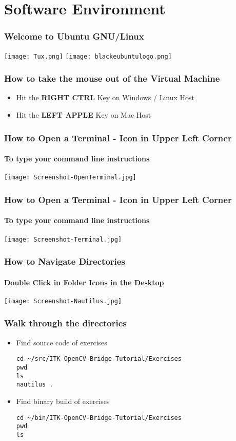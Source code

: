 \section{Software Environment}


\begin{frame}
\frametitle{Welcome to Ubuntu GNU/Linux}
\begin{center}
\texttt{[image: Tux.png]}
\texttt{[image: blackeubuntulogo.png]}
\end{center}
\end{frame}

\begin{frame}
\frametitle{How to take the mouse out of the Virtual Machine}
\begin{itemize}
\item Hit the \textbf{RIGHT CTRL} Key on Windows / Linux Host
\item Hit the \textbf{LEFT APPLE} Key on Mac Host
\end{itemize}
\end{frame}

\begin{frame}
\frametitle{How to Open a Terminal - Icon in Upper Left Corner}
\framesubtitle{To type your command line instructions}
\begin{center}
\texttt{[image: Screenshot-OpenTerminal.jpg]}
\end{center}
\end{frame}

\begin{frame}
\frametitle{How to Open a Terminal - Icon in Upper Left Corner}
\framesubtitle{To type your command line instructions}
\begin{center}
\texttt{[image: Screenshot-Terminal.jpg]}
\end{center}
\end{frame}

\begin{frame}
\frametitle{How to Navigate Directories}
\framesubtitle{Double Click in Folder Icons in the Desktop}
\begin{center}
\texttt{[image: Screenshot-Nautilus.jpg]}
\end{center}
\end{frame}

\begin{frame}[fragile]
\frametitle{Walk through the directories}
\begin{itemize}
\item Find source code of exercises
\begin{verbatim}
cd ~/src/ITK-OpenCV-Bridge-Tutorial/Exercises
pwd
ls
nautilus .
\end{verbatim}
\pause
\item Find binary build of exercises
\begin{verbatim}
cd ~/bin/ITK-OpenCV-Bridge-Tutorial/Exercises
pwd
ls
\end{verbatim}
\end{itemize}
\end{frame}

